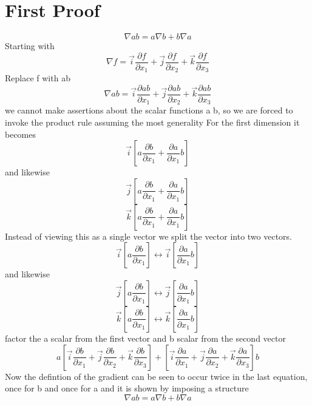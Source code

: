\documentclass[12pt]{article}
\begin{document}
\section{First Proof}
\begin{equation}
\nabla ab = a\nabla b + b\nabla a
\end{equation}
Starting with
\begin{equation}
\nabla f = \vec{i} \frac{\partial f}{\partial x_1} +\vec{j} \frac{\partial f}{\partial x_2}+\vec{k} \frac{\partial f}{\partial x_3}
\end{equation}
Replace f with ab
\begin{equation}
\nabla ab = \vec{i} \frac{\partial ab}{\partial x_1} +\vec{j} \frac{\partial ab}{\partial x_2}+\vec{k} \frac{\partial ab}{\partial x_3}
\end{equation}
we cannot make assertions about the scalar functions a b, so we are forced to invoke the 
product rule assuming the most generality
For the first dimension it becomes
\begin{equation}
\vec{i}\left[ a \frac{\partial b}{\partial x_1} +  \frac{\partial a}{\partial x_1} b \right]
\end{equation}
and likewise
\begin{equation}
\vec{j}\left[ a \frac{\partial b}{\partial x_1} +  \frac{\partial a}{\partial x_1} b \right]
\end{equation}
\begin{equation}
\vec{k}\left[ a \frac{\partial b}{\partial x_1} +  \frac{\partial a}{\partial x_1} b \right]
\end{equation}
Instead of viewing this as a single vector we split the vector into two vectors.
\begin{equation}
\vec{i}\left[ a \frac{\partial b}{\partial x_1}\right] \longleftrightarrow \vec{i}\left[ \frac{\partial a}{\partial x_1} b \right]
\end{equation}
and likewise
\begin{equation}
\vec{j}\left[ a \frac{\partial b}{\partial x_1} \right]  \longleftrightarrow  \vec{j}\left[  \frac{\partial a}{\partial x_1} b \right]
\end{equation}
\begin{equation}
\vec{k}\left[ a \frac{\partial b}{\partial x_1} \right]  \longleftrightarrow \vec{k}\left[ \frac{\partial a}{\partial x_1} b \right]
\end{equation}
factor the a scalar from the first vector and b scalar from the second vector
\begin{equation}
a \left[ \vec{i}  \frac{\partial b}{\partial x_1}+ \vec{j}  \frac{\partial b}{\partial x_2} + \vec{k}  \frac{\partial b}{\partial x_3} \right] +\left[ \vec{i}  \frac{\partial a}{\partial x_1}+ \vec{j}  \frac{\partial a}{\partial x_2} + \vec{k}  \frac{\partial a}{\partial x_3} \right]  b  
\end{equation}
Now the defintion of the gradient can be seen to occur twice in the last equation, once for b and once for a
and it is shown by imposing a structure
\begin{equation}
\nabla ab = a\nabla b + b\nabla a
\end{equation}
\end{document}
